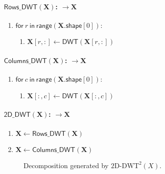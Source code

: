 \paragraph{$\mathsf{Rows\_DWT}(\mathbf{X})$: $\rightarrow\mathbf{X}$}
\label{alg:Rows-DWT}
\begin{enumerate}
  \item $\mathsf{for}~r~\mathsf{in~range}(\mathbf{X}.\mathsf{shape}[0])$:
  \begin{enumerate}
     \item ${\mathbf X}[r,:]\leftarrow\mathsf{DWT}(\mathbf{X}[r,:])$
  \end{enumerate}
\end{enumerate}

\paragraph{$\mathsf{Columns\_DWT}(\mathbf{X})$: $\rightarrow\mathbf{X}$}
\label{alg:Columns-DWT}
\begin{enumerate}
  \item $\mathsf{for}~c~\mathsf{in~range}(\mathbf{X}.\mathsf{shape}[0])$:
  \begin{enumerate}
     \item ${\mathbf X}[:,c]\leftarrow\mathsf{DWT}(\mathbf{X}[:,c])$
  \end{enumerate}
\end{enumerate}

\paragraph{$\mathsf{2D\_DWT}(\mathbf{X})$: $\rightarrow\mathbf{X}$}
\label{alg:2D-DWT}
\begin{enumerate}
   \item ${\mathbf X}\leftarrow\mathsf{Rows\_DWT}(\mathbf{X})$
   \item ${\mathbf X}\leftarrow\mathsf{Columns\_DWT}(\mathbf{X})$
\end{enumerate}

\begin{figure}
  \centering
  \caption{Decomposition generated by $\text{2D-DWT}^2(X)$.}
  \label{fig:2D-DWT}
\end{figure}

